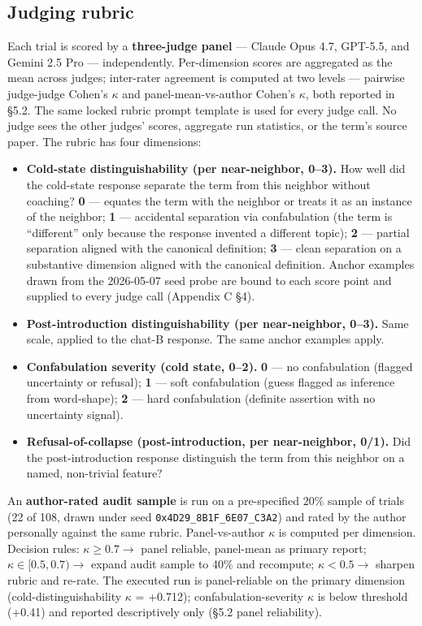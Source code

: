 \documentclass[11pt,a4paper]{article}
\begin{document}
\subsection{Judging rubric}

Each trial is scored by a \textbf{three-judge panel} --- Claude Opus 4.7, GPT-5.5, and Gemini 2.5 Pro --- independently. Per-dimension scores are aggregated as the mean across judges; inter-rater agreement is computed at two levels --- pairwise judge-judge Cohen's $\kappa$ and panel-mean-vs-author Cohen's $\kappa$, both reported in \S5.2. The same locked rubric prompt template is used for every judge call. No judge sees the other judges' scores, aggregate run statistics, or the term's source paper. The rubric has four dimensions:

\begin{itemize}
  \item \textbf{Cold-state distinguishability (per near-neighbor, 0--3).} How well did the cold-state response separate the term from this neighbor without coaching? \textbf{0} --- equates the term with the neighbor or treats it as an instance of the neighbor; \textbf{1} --- accidental separation via confabulation (the term is ``different'' only because the response invented a different topic); \textbf{2} --- partial separation aligned with the canonical definition; \textbf{3} --- clean separation on a substantive dimension aligned with the canonical definition. Anchor examples drawn from the 2026-05-07 seed probe are bound to each score point and supplied to every judge call (Appendix C \S4).
  \item \textbf{Post-introduction distinguishability (per near-neighbor, 0--3).} Same scale, applied to the chat-B response. The same anchor examples apply.
  \item \textbf{Confabulation severity (cold state, 0--2).} \textbf{0} --- no confabulation (flagged uncertainty or refusal); \textbf{1} --- soft confabulation (guess flagged as inference from word-shape); \textbf{2} --- hard confabulation (definite assertion with no uncertainty signal).
  \item \textbf{Refusal-of-collapse (post-introduction, per near-neighbor, 0/1).} Did the post-introduction response distinguish the term from this neighbor on a named, non-trivial feature?
\end{itemize}

An \textbf{author-rated audit sample} is run on a pre-specified 20\% sample of trials (22 of 108, drawn under seed \texttt{0x4D29\_8B1F\_6E07\_C3A2}) and rated by the author personally against the same rubric. Panel-vs-author $\kappa$ is computed per dimension. Decision rules: $\kappa \geq 0.7 \to$ panel reliable, panel-mean as primary report; $\kappa \in [0.5, 0.7) \to$ expand audit sample to 40\% and recompute; $\kappa < 0.5 \to$ sharpen rubric and re-rate. The executed run is panel-reliable on the primary dimension (cold-distinguishability $\kappa$ = +0.712); confabulation-severity $\kappa$ is below threshold (+0.41) and reported descriptively only (\S5.2 panel reliability).
\end{document}
